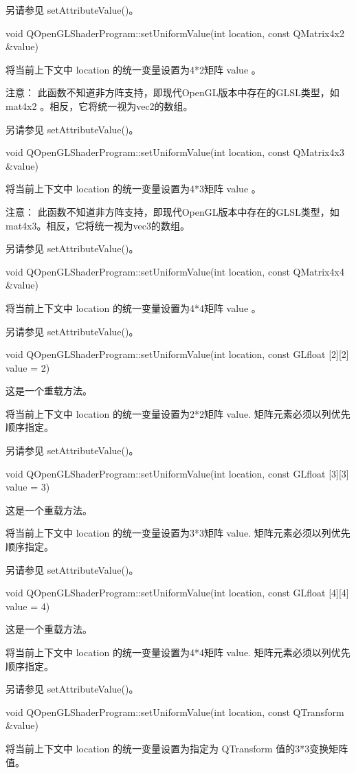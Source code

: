 另请参见 setAttributeValue()。

void QOpenGLShaderProgram::setUniformValue(int location, const QMatrix4x2 \&value)

将当前上下文中 location 的统一变量设置为4*2矩阵 value 。

注意： 此函数不知道非方阵支持，即现代OpenGL版本中存在的GLSL类型，如 mat4x2 。相反，它将统一视为vec2的数组。

另请参见 setAttributeValue()。

void QOpenGLShaderProgram::setUniformValue(int location, const QMatrix4x3 \&value)

将当前上下文中 location 的统一变量设置为4*3矩阵 value 。

注意： 此函数不知道非方阵支持，即现代OpenGL版本中存在的GLSL类型，如 mat4x3。相反，它将统一视为vec3的数组。

另请参见 setAttributeValue()。

void QOpenGLShaderProgram::setUniformValue(int location, const QMatrix4x4 \&value)

将当前上下文中 location 的统一变量设置为4*4矩阵 value 。

另请参见 setAttributeValue()。

void QOpenGLShaderProgram::setUniformValue(int location, const GLfloat [2][2] value = 2)

这是一个重载方法。

将当前上下文中 location 的统一变量设置为2*2矩阵 value. 矩阵元素必须以列优先顺序指定。

另请参见 setAttributeValue()。

void QOpenGLShaderProgram::setUniformValue(int location, const GLfloat [3][3] value = 3)

这是一个重载方法。

将当前上下文中 location 的统一变量设置为3*3矩阵 value. 矩阵元素必须以列优先顺序指定。

另请参见 setAttributeValue()。

void QOpenGLShaderProgram::setUniformValue(int location, const GLfloat [4][4] value = 4)

这是一个重载方法。

将当前上下文中 location 的统一变量设置为4*4矩阵 value. 矩阵元素必须以列优先顺序指定。

另请参见 setAttributeValue()。

void QOpenGLShaderProgram::setUniformValue(int location, const QTransform \&value)

将当前上下文中 location 的统一变量设置为指定为 QTransform 值的3*3变换矩阵值。

